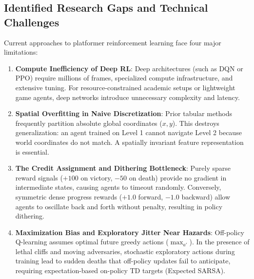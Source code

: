 \subsection{Identified Research Gaps and Technical Challenges}
Current approaches to platformer reinforcement learning face four major limitations:
\begin{enumerate}
    \item \textbf{Compute Inefficiency of Deep RL}: Deep architectures (such as DQN or PPO) require millions of frames, specialized compute infrastructure, and extensive tuning. For resource-constrained academic setups or lightweight game agents, deep networks introduce unnecessary complexity and latency.
    \item \textbf{Spatial Overfitting in Naive Discretization}: Prior tabular methods frequently partition absolute global coordinates ($x, y$). This destroys generalization: an agent trained on Level 1 cannot navigate Level 2 because world coordinates do not match. A spatially invariant feature representation is essential.
    \item \textbf{The Credit Assignment and Dithering Bottleneck}: Purely sparse reward signals ($+100$ on victory, $-50$ on death) provide no gradient in intermediate states, causing agents to timeout randomly. Conversely, symmetric dense progress rewards ($+1.0$ forward, $-1.0$ backward) allow agents to oscillate back and forth without penalty, resulting in policy dithering.
    \item \textbf{Maximization Bias and Exploratory Jitter Near Hazards}: Off-policy Q-learning assumes optimal future greedy actions ($\max_{a'}$). In the presence of lethal cliffs and moving adversaries, stochastic exploratory actions during training lead to sudden deaths that off-policy updates fail to anticipate, requiring expectation-based on-policy TD targets (Expected SARSA).
\end{enumerate}

